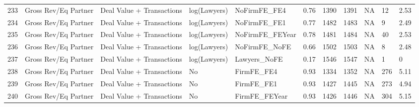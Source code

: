 \documentclass{article}
\begin{document}
\begin{table}[H]
\begin{tabular}{rllllllllll}
  233 & Gross Rev/Eq Partner & Deal Value + Transactions & log(Lawyers) & NoFirmFE\_FE4 & 0.76 & 1390 & 1391 & NA & 12 & 2.53 \\
  234 & Gross Rev/Eq Partner & Deal Value + Transactions & log(Lawyers) & NoFirmFE\_FE1 & 0.77 & 1482 & 1483 & NA & 9 & 2.49 \\
  235 & Gross Rev/Eq Partner & Deal Value + Transactions & log(Lawyers) & NoFirmFE\_FEYear & 0.78 & 1481 & 1484 & NA & 40 & 2.53 \\
  236 & Gross Rev/Eq Partner & Deal Value + Transactions & log(Lawyers) & NoFirmFE\_NoFE & 0.66 & 1502 & 1503 & NA & 8 & 2.48 \\
  237 & Gross Rev/Eq Partner & Deal Value + Transactions & log(Lawyers) & Lawyers\_NoFE & 0.17 & 1546 & 1547 & NA & 1 & 0 \\
  238 & Gross Rev/Eq Partner & Deal Value + Transactions & No & FirmFE\_FE4 & 0.93 & 1334 & 1352 & NA & 276 & 5.11 \\
  239 & Gross Rev/Eq Partner & Deal Value + Transactions & No & FirmFE\_FE1 & 0.93 & 1427 & 1445 & NA & 273 & 4.94 \\
  240 & Gross Rev/Eq Partner & Deal Value + Transactions & No & FirmFE\_FEYear & 0.93 & 1426 & 1446 & NA & 304 & 5.15 \\
   \hline
\end{tabular}
\end{table}
\end{document}
